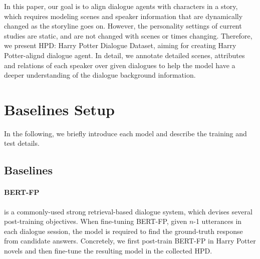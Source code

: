 \documentclass[11pt]{article}
\begin{document}
In this paper, our goal is to align dialogue agents with characters in a story,  which requires modeling scenes and speaker information that are dynamically changed as the storyline goes on.
However, the personality settings of current studies are static, and are not changed with scenes or times changing. Therefore, we present HPD: Harry Potter Dialogue Dataset, aiming for creating Harry Potter-alignd dialogue agent. In detail, we annotate detailed scenes,  attributes and relations of each speaker over given dialogues to help the model have a deeper understanding of the dialogue background information.  





















\section{Baselines Setup}
\label{baselines}
In the following, we briefly introduce each model and describe the training and test details.
\subsection{Baselines}








\paragraph{BERT-FP} is a commonly-used strong retrieval-based dialogue system, which devises several post-training objectives. When fine-tuning BERT-FP, given $n$-1 utterances in each dialogue session, the model is required to find the ground-truth response from  candidate answers. Concretely, we first post-train BERT-FP in Harry Potter novels and then fine-tune the resulting model in the collected HPD.
\end{document}
